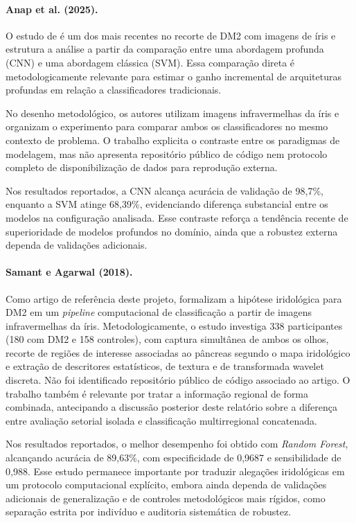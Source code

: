 \documentclass[11pt,a4paper]{article}
\begin{document}
\paragraph{Anap et al. (2025).}
O estudo de \citet{AnapEtAl2025ICEC2NT} é um dos mais recentes no recorte de DM2 com imagens de íris e estrutura a análise a partir da comparação entre uma abordagem profunda (CNN) e uma abordagem clássica (SVM). Essa comparação direta é metodologicamente relevante para estimar o ganho incremental de arquiteturas profundas em relação a classificadores tradicionais.

No desenho metodológico, os autores utilizam imagens infravermelhas da íris e organizam o experimento para comparar ambos os classificadores no mesmo contexto de problema. O trabalho explicita o contraste entre os paradigmas de modelagem, mas não apresenta repositório público de código nem protocolo completo de disponibilização de dados para reprodução externa.

Nos resultados reportados, a CNN alcança acurácia de validação de 98,7\%, enquanto a SVM atinge 68,39\%, evidenciando diferença substancial entre os modelos na configuração analisada. Esse contraste reforça a tendência recente de superioridade de modelos profundos no domínio, ainda que a robustez externa dependa de validações adicionais.

\paragraph{Samant e Agarwal (2018).}
Como artigo de referência deste projeto, \citet{SamantAgarwal2018CMPB} formalizam a hipótese iridológica para DM2 em um \textit{pipeline} computacional de classificação a partir de imagens infravermelhas da íris. Metodologicamente, o estudo investiga 338 participantes (180 com DM2 e 158 controles), com captura simultânea de ambos os olhos, recorte de regiões de interesse associadas ao pâncreas segundo o mapa iridológico e extração de descritores estatísticos, de textura e de transformada wavelet discreta. Não foi identificado repositório público de código associado ao artigo. O trabalho também é relevante por tratar a informação regional de forma combinada, antecipando a discussão posterior deste relatório sobre a diferença entre avaliação setorial isolada e classificação multirregional concatenada.

Nos resultados reportados, o melhor desempenho foi obtido com \textit{Random Forest}, alcançando acurácia de 89,63\%, com especificidade de 0,9687 e sensibilidade de 0,988. Esse estudo permanece importante por traduzir alegações iridológicas em um protocolo computacional explícito, embora ainda dependa de validações adicionais de generalização e de controles metodológicos mais rígidos, como separação estrita por indivíduo e auditoria sistemática de robustez.
\end{document}

